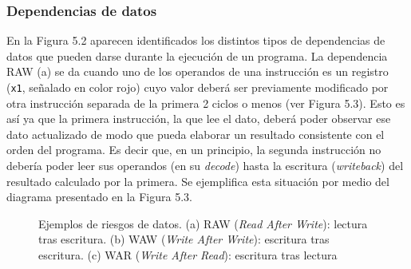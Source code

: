 \subsubsection{Dependencias de datos}

En la Figura 5.2 aparecen identificados los distintos tipos de dependencias de datos que pueden darse durante la ejecución de un programa. La dependencia RAW (a) se da cuando uno de los operandos de una instrucción es un registro (\texttt{x1}, señalado en color rojo) cuyo valor deberá ser previamente modificado por otra instrucción separada de la primera 2 ciclos o menos (ver Figura 5.3). Esto es así ya que la primera instrucción, la que lee el dato, deberá poder observar ese dato actualizado de modo que pueda elaborar un resultado consistente con el orden del programa. Es decir que, en un principio, la segunda instrucción no debería poder leer sus operandos (en su \textit{decode}) hasta la escritura (\textit{writeback}) del resultado calculado por la primera. Se ejemplifica esta situación por medio del diagrama presentado en la Figura 5.3.

\vspace{+0.2cm}
\begin{figure}[h]
\centering

\setlength{\fboxsep}{10pt}
\setlength{\fboxrule}{1pt}


\caption{Ejemplos de riesgos de datos. (a) RAW (\textit{Read After Write}): lectura tras escritura. (b) WAW (\textit{Write After Write}): escritura tras escritura. (c) WAR (\textit{Write After Read}): escritura tras lectura}
\label{fig:dependencias_riscv}

\end{figure}

